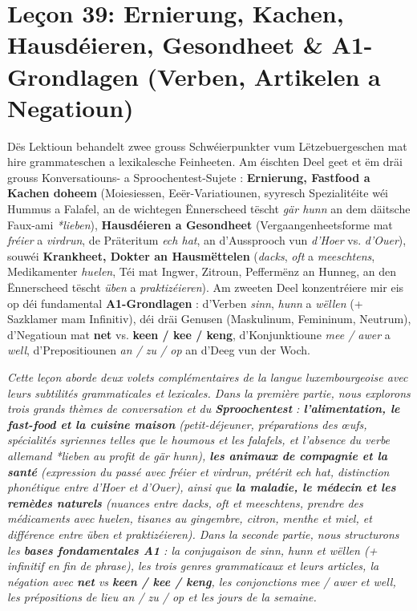 \chapter[Leçon 39: Ernierung, Hausdéieren, Gesondheet \& A1-Grondlagen]{Leçon 39: Ernierung, Kachen, Hausdéieren, Gesondheet \& A1-Grondlagen (Verben, Artikelen a Negatioun)}

Dës Lektioun behandelt zwee grouss Schwéierpunkter vum Lëtzebuergeschen mat hire grammateschen a lexikalesche Feinheeten. Am éischten Deel geet et ëm dräi grouss Konversatiouns- a Sproochentest-Sujete : \textbf{Ernierung, Fastfood a Kachen doheem} (Moiesiessen, Eeër-Variatiounen, syyresch Spezialitéite wéi Hummus a Falafel, an de wichtegen Ënnerscheed tëscht \textit{gär hunn} an dem däitsche Faux-ami \textit{*lieben}), \textbf{Hausdéieren a Gesondheet} (Vergaangenheetsforme mat \textit{fréier} a \textit{virdrun}, de Präteritum \textit{ech hat}, an d'Aussprooch vun \textit{d'Hoer} vs. \textit{d'Ouer}), souwéi \textbf{Krankheet, Dokter an Hausmëttelen} (\textit{dacks}, \textit{oft} a \textit{meeschtens}, Medikamenter \textit{huelen}, Téi mat Ingwer, Zitroun, Peffermënz an Hunneg, an den Ënnerscheed tëscht \textit{üben} a \textit{praktizéieren}). Am zweeten Deel konzentréiere mir eis op déi fundamental \textbf{A1-Grondlagen} : d'Verben \textit{sinn}, \textit{hunn} a \textit{wëllen} (+ Sazklamer mam Infinitiv), déi dräi Genusen (Maskulinum, Femininum, Neutrum), d'Negatioun mat \textbf{net} vs. \textbf{keen / kee / keng}, d'Konjunktioune \textit{mee / awer} a \textit{well}, d'Prepositiounen \textit{an / zu / op} an d'Deeg vun der Woch.

\textit{Cette leçon aborde deux volets complémentaires de la langue luxembourgeoise avec leurs subtilités grammaticales et lexicales. Dans la première partie, nous explorons trois grands thèmes de conversation et du \textbf{Sproochentest} : \textbf{l'alimentation, le fast-food et la cuisine maison} (petit-déjeuner, préparations des œufs, spécialités syriennes telles que le houmous et les falafels, et l'absence du verbe allemand \textit{*lieben} au profit de \textit{gär hunn}), \textbf{les animaux de compagnie et la santé} (expression du passé avec \textit{fréier} et \textit{virdrun}, prétérit \textit{ech hat}, distinction phonétique entre \textit{d'Hoer} et \textit{d'Ouer}), ainsi que \textbf{la maladie, le médecin et les remèdes naturels} (nuances entre \textit{dacks}, \textit{oft} et \textit{meeschtens}, prendre des médicaments avec \textit{huelen}, tisanes au gingembre, citron, menthe et miel, et différence entre \textit{üben} et \textit{praktizéieren}). Dans la seconde partie, nous structurons les \textbf{bases fondamentales A1} : la conjugaison de \textit{sinn}, \textit{hunn} et \textit{wëllen} (+ infinitif en fin de phrase), les trois genres grammaticaux et leurs articles, la négation avec \textbf{net} vs \textbf{keen / kee / keng}, les conjonctions \textit{mee / awer} et \textit{well}, les prépositions de lieu \textit{an / zu / op} et les jours de la semaine.}

